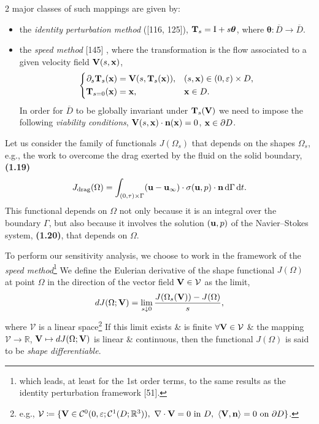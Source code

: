 \documentclass[oneside]{book}
\numberwithin{equation}{section}
\begin{document}
2 major classes of such mappings are given by:
\begin{itemize}
	\item the \textit{identity perturbation method} ([116, 125]), ${\bf T}_s = {\rm I} + s\boldsymbol{\theta}$, where $\boldsymbol{\theta}:\overline{D}\to\overline{D}$.
	\item the \textit{speed method} [145] \cite{Pironneau1984}, where the transformation is the flow associated to a given velocity field ${\bf V}(s,{\bf x})$,
	\begin{equation*}
		\left\{\begin{split}
			\partial_s{\bf T}_s({\bf x}) &= {\bf V}(s,{\bf T}_s({\bf x})),&&(s,{\bf x})\in(0,\varepsilon)\times D,\\
			{\bf T}_{s=0}({\bf x}) &= {\bf x},&&{\bf x}\in D.
		\end{split}\right.
	\end{equation*}
	In order for $\overline{D}$ to be globally invariant under ${\bf T}_s({\bf V})$ we need to impose the following \textit{viability conditions}, ${\bf V}(s,{\bf x})\cdot{\bf n}({\bf x}) = 0$, ${\bf x}\in\partial D$.
\end{itemize}
Let us consider the family of functionals $J(\Omega_s)$ that depends on the shapes $\Omega_s$, e.g., the work to overcome the drag exerted by the fluid on the solid boundary, \textbf{(1.19)}
\begin{align*}
	J_{\rm drag}(\Omega) = \int_{(0,\tau)\times\Gamma} ({\bf u} - {\bf u}_\infty)\cdot\sigma({\bf u},p)\cdot{\bf n}\,{\rm d}\Gamma\,{\rm d}t.
\end{align*}
This functional depends on $\Omega$ not only because it is an integral over the boundary $\Gamma$, but also because it involves the solution $({\bf u},p)$ of the Navier--Stokes system, \textbf{(1.20)}, that depends on $\Omega$.

To perform our sensitivity analysis, we choose to work in the framework of the \textit{speed method}\footnote{which leads, at least for the 1st order terms, to the same results as the identity perturbation framework [51].} We define the Eulerian derivative of the shape functional $J(\Omega)$ at point $\Omega$ in the direction of the vector field ${\bf V}\in\mathcal{V}$ as the limit,
\begin{align*}
	dJ(\Omega;{\bf V}) = \lim_{s\downarrow 0} \frac{J(\Omega_s({\bf V})) - J(\Omega)}{s},
\end{align*}
where $\mathcal{V}$ is a linear space\footnote{e.g., $\mathcal{V}\coloneqq\{{\bf V}\in\mathcal{C}^0(0,\varepsilon;\mathcal{C}^1(D;\mathbb{R}^3)),\ \nabla\cdot{\bf V} = 0\mbox{ in } D,\ \langle{\bf V},{\bf n}\rangle = 0\mbox{ on }\partial D\}$.} If this limit exists \& is finite $\forall{\bf V}\in\mathcal{V}$ \& the mapping $\mathcal{V}\to\mathbb{R}$, ${\bf V}\mapsto dJ(\Omega;{\bf V})$ is linear \& continuous, then the functional $J(\Omega)$ is said to be \textit{shape differentiable}.
\end{document}
